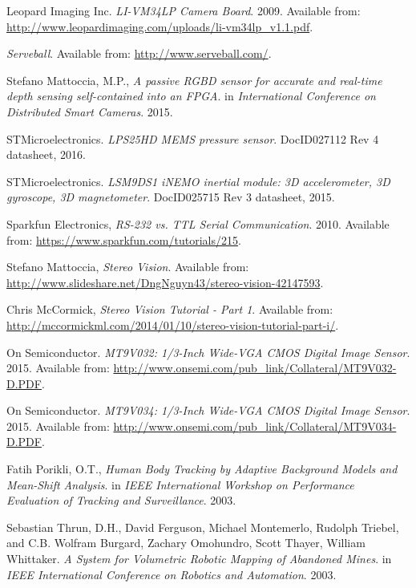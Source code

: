 \begin{thebibliography}{9}
Leopard Imaging Inc.
\textit{LI-VM34LP Camera Board}. 2009.
Available from: \url{http://www.leopardimaging.com/uploads/li-vm34lp_v1.1.pdf}.

\textit{Serveball}.
Available from: \url{http://www.serveball.com/}.

Stefano Mattoccia, M.P.,
\textit{A passive RGBD sensor for accurate and real-time depth sensing self-contained into an FPGA}.
in \textit{International Conference on Distributed Smart Cameras}. 2015.

STMicroelectronics. \textit{LPS25HD MEMS pressure sensor}. DocID027112 Rev 4 datasheet, 2016.

STMicroelectronics. \textit{LSM9DS1 iNEMO inertial module: 3D accelerometer, 3D gyroscope, 3D magnetometer}. DocID025715 Rev 3 datasheet, 2015.

Sparkfun Electronics, \textit{RS-232 vs. TTL Serial Communication}. 2010. Available from: \url{https://www.sparkfun.com/tutorials/215}.

Stefano Mattoccia, \textit{Stereo Vision}. Available from: \url{http://www.slideshare.net/DngNguyn43/stereo-vision-42147593}.

Chris McCormick, \textit{Stereo Vision Tutorial  - Part 1}. Available from: \url{http://mccormickml.com/2014/01/10/stereo-vision-tutorial-part-i/}.

On Semiconductor. 
\textit{MT9V032: 1/3-Inch Wide-VGA CMOS Digital Image Sensor}. 2015. 
Available from: \url{http://www.onsemi.com/pub_link/Collateral/MT9V032-D.PDF}.

On Semiconductor. 
\textit{MT9V034: 1/3-Inch Wide-VGA CMOS Digital Image Sensor}. 2015. 
Available from: \url{http://www.onsemi.com/pub_link/Collateral/MT9V034-D.PDF}.

Fatih Porikli, O.T.,
\textit{Human Body Tracking by Adaptive Background Models and Mean-Shift Analysis}.
in \textit{IEEE International Workshop on Performance Evaluation of Tracking and Surveillance}. 2003.

Sebastian Thrun, D.H., David Ferguson, Michael Montemerlo, Rudolph Triebel, and C.B. Wolfram Burgard, Zachary Omohundro, Scott Thayer, William Whittaker.
\textit{A System for Volumetric Robotic Mapping of Abandoned Mines}. 
in \textit{IEEE International Conference on Robotics and Automation}. 2003.


\end{thebibliography}
